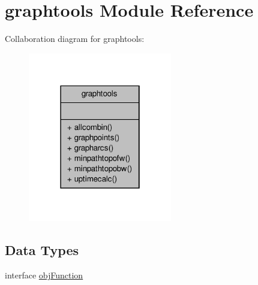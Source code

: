 \hypertarget{classgraphtools}{\section{graphtools Module Reference}
\label{classgraphtools}
}


Collaboration diagram for graphtools\-:\nopagebreak
\begin{figure}[H]
\begin{center}
\leavevmode
\includegraphics[width=178pt]{classgraphtools__coll__graph}
\end{center}
\end{figure}
\subsection*{Data Types}
\begin{DoxyCompactItemize}
\item 
interface \hyperlink{interfacegraphtools_1_1obj_function}{obj\-Function}
\end{DoxyCompactItemize}
